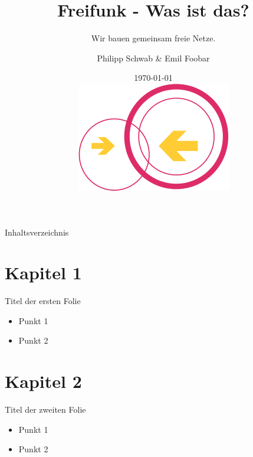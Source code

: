 \documentclass{beamer}
\begin{document}
\title[Freifunk]{Freifunk - Was ist das?}
\subtitle[Offene Netze]{Wir bauen gemeinsam freie Netze.}
\author{Philipp Schwab \& Emil Foobar}
\date{\today\\\vspace{0.5cm} \includegraphics[scale=0.3]{logo-transparent.png}}

\begin{frame}
\titlepage	
\end{frame}
\begin{frame}{Inhaltsverzeichnis}
	\tableofcontents
\end{frame}
\section{Kapitel 1}
\begin{frame}{Titel der ersten Folie}
\begin{itemize}
	\item Punkt 1
	\item Punkt 2
\end{itemize}
\end{frame}
\section{Kapitel 2}
\begin{frame}{Titel der zweiten Folie}
	\begin{itemize}
		\item Punkt 1
		\item Punkt 2
	\end{itemize}
\end{frame}
\end{document}
